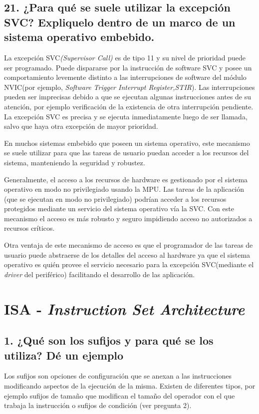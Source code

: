 \documentclass[10pt,a4paper,twoside,spanish]{article}	%
\begin{document}
\subsection*{21. ¿Para qué se suele utilizar la excepción SVC? Expliquelo dentro de un marco de un sistema operativo embebido.}

La excepción SVC\textit{(Supervisor Call)} es de tipo 11 y su nivel de prioridad puede ser programado. Puede dispararse por la instrucción de software SVC y posee un comportamiento levemente distinto a las interrupciones de software del módulo NVIC(por ejemplo, \textit{Software Trigger Interrupt Register,STIR}). Las interrupciones pueden ser imprecisas debido a que se ejecutan algunas instrucciones antes de su atención, por ejemplo verificación de la existencia de otra interrupción pendiente. La excepción SVC es precisa y se ejecuta inmediatamente luego de ser llamada, salvo que haya otra excepción de mayor prioridad.

En muchos sistemas embebido que poseen un sistema operativo, este mecanismo se suele utilizar para que las tareas de usuario puedan acceder a los recursos del sistema, manteniendo la seguridad y robustez.

Generalmente, el acceso a los recursos de hardware es gestionado por el sistema operativo en modo no privilegiado usando la MPU. Las tareas de la aplicación (que se ejecutan en modo no privilegiado) podrían acceder a los recursos protegidos mediante un servicio del sistema operativo vía la SVC. Con este mecanismo el acceso es más robusto y seguro impidiendo acceso no autorizados a recursos críticos.  


Otra ventaja de este mecanismo de acceso es que el programador de las tareas de usuario puede abstraerse de los detalles del acceso al hardware ya que el sistema operativo es quién provee el servicio necesario para la excepción SVC(mediante el \textit{driver} del periférico) facilitando el desarrollo de las aplicación.

 
\section*{ISA - \textit{Instruction Set Architecture}}

\subsection*{1. ¿Qué son los sufijos y para qué se los utiliza? Dé un ejemplo}

Los sufijos son opciones de configuración que se anexan a las instrucciones modificando aspectos de la ejecución de la misma. Existen de diferentes tipos, por ejemplo sufijos de tamaño que modifican el tamaño del operador con el que trabaja la instrucción o sufijos de condición (ver pregunta 2).
\end{document}
